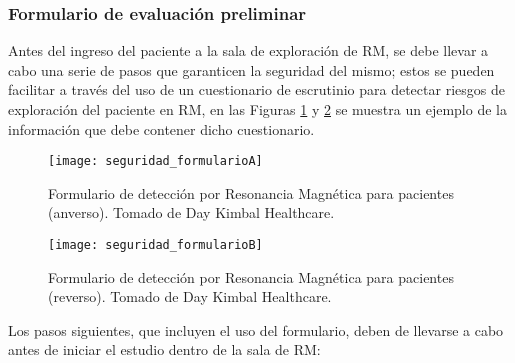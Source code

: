 \subsubsection{Formulario de evaluación preliminar}
Antes del ingreso del paciente a la sala de exploración de RM, se debe llevar a cabo una serie de pasos que garanticen la seguridad del mismo; estos se pueden facilitar a través del uso de un cuestionario de escrutinio para detectar riesgos de exploración del paciente en RM, en las Figuras \ref{fig:seguridad_formularioA} y \ref{fig:seguridad_formularioB} se muestra un ejemplo de la información que debe contener dicho cuestionario.



\begin{figure}[htb]
\begin{figg}
   \texttt{[image: seguridad\_formularioA]}
   \caption{Formulario de detección por Resonancia Magnética para pacientes (anverso). Tomado de Day Kimbal Healthcare. }
 \label{fig:seguridad_formularioA}
 \end{figg}
\end{figure}

\begin{figure}[htb]
\begin{figg}
   \texttt{[image: seguridad\_formularioB]}
   \caption{Formulario de detección por Resonancia Magnética para pacientes (reverso). Tomado de Day Kimbal Healthcare. }
 \label{fig:seguridad_formularioB}
 \end{figg}
\end{figure}



Los pasos siguientes, que incluyen el uso del formulario, deben de llevarse a cabo antes de iniciar el estudio dentro de la sala de RM: 


